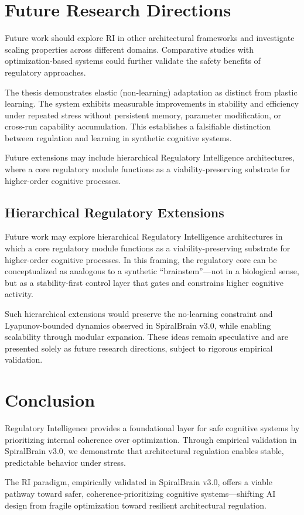 \documentclass[12pt,a4paper]{report}
\begin{document}
\section{Future Research Directions}

Future work should explore RI in other architectural frameworks and investigate scaling properties across different domains. Comparative studies with optimization-based systems could further validate the safety benefits of regulatory approaches.

The thesis demonstrates elastic (non-learning) adaptation as distinct from plastic learning. The system exhibits measurable improvements in stability and efficiency under repeated stress without persistent memory, parameter modification, or cross-run capability accumulation. This establishes a falsifiable distinction between regulation and learning in synthetic cognitive systems.

Future extensions may include hierarchical Regulatory Intelligence architectures, where a core regulatory module functions as a viability-preserving substrate for higher-order cognitive processes.

\subsection{Hierarchical Regulatory Extensions}

Future work may explore hierarchical Regulatory Intelligence architectures in which a core regulatory module functions as a viability-preserving substrate for higher-order cognitive processes. In this framing, the regulatory core can be conceptualized as analogous to a synthetic ``brainstem''—not in a biological sense, but as a stability-first control layer that gates and constrains higher cognitive activity.

Such hierarchical extensions would preserve the no-learning constraint and Lyapunov-bounded dynamics observed in SpiralBrain v3.0, while enabling scalability through modular expansion. These ideas remain speculative and are presented solely as future research directions, subject to rigorous empirical validation.

\section{Conclusion}

Regulatory Intelligence provides a foundational layer for safe cognitive systems by prioritizing internal coherence over optimization. Through empirical validation in SpiralBrain v3.0, we demonstrate that architectural regulation enables stable, predictable behavior under stress.

The RI paradigm, empirically validated in SpiralBrain v3.0, offers a viable pathway toward safer, coherence-prioritizing cognitive systems—shifting AI design from fragile optimization toward resilient architectural regulation.



\end{document}
